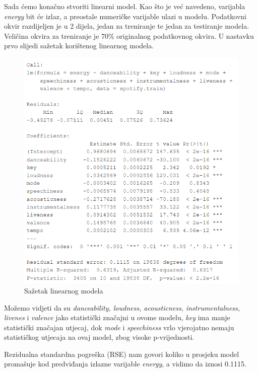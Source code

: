 	Sada ćemo konačno stvoriti linearni model. Kao što je već navedeno, varijabla \textit{energy} bit će izlaz, a preostale numeričke varijable ulazi u modelu.
	Podatkovni okvir razdijeljen je u 2 dijela, jedan za treniranje te jedan za testiranje modela. Veličina okvira za treniranje je 70\% originalnog podatkovnog okvira. 
	U nastavku prvo slijedi sažetak korištenog linearnog modela.
	
	\begin{figure}[H]
		\includegraphics[scale=0.9]{slike/linReg.png}
		\centering
		\caption{Sažetak linearnog modela}
		
	\end{figure}
	
	Možemo vidjeti da su \textit{danceability, loudness, acousticness, instrumentalness, livenes} i \textit{valence} jako statistički značajni u ovome modelu, \textit{key} ima manje statistički značajan utjecaj, dok \textit{mode} i \textit{speechiness} vrlo vjerojatno nemaju statističkog utjecaja na ovaj model, zbog visoke p-vrijednosti.
	
	Rezidualna standardna pogreška (RSE) nam govori koliko u prosjeku model promašuje kod predviđanja izlazne varijable \textit{energy}, a vidimo da iznosi 0.1115.
	
